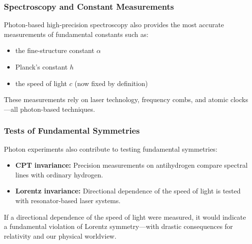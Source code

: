 \subsubsection{Spectroscopy and Constant Measurements}

Photon-based high-precision spectroscopy also provides the most accurate measurements of fundamental constants such as:

\begin{itemize}
	\item the fine-structure constant $\alpha$
	\item Planck’s constant $h$
	\item the speed of light $c$ (now fixed by definition)
\end{itemize}

These measurements rely on laser technology, frequency combs, and atomic clocks—all photon-based techniques.

\subsubsection{Tests of Fundamental Symmetries}

Photon experiments also contribute to testing fundamental symmetries:

\begin{itemize}
	\item \textbf{CPT invariance:} Precision measurements on antihydrogen compare spectral lines with ordinary hydrogen.
	\item \textbf{Lorentz invariance:} Directional dependence of the speed of light is tested with resonator-based laser systems.
\end{itemize}
\vspace{0.5em}
\begin{tcolorbox}[hypobox, title={What If Light Were Not Isotropic?}]
	\label{box:was wäre nicht isotop}
	If a directional dependence of the speed of light were measured, it would indicate a fundamental violation of Lorentz symmetry—with drastic consequences for relativity and our physical worldview.
\end{tcolorbox}

